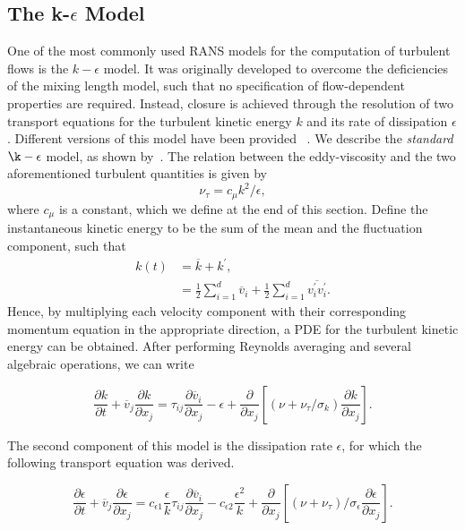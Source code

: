 \subsection{The k-$\epsilon$ Model}
One of the most commonly used RANS models for the computation of turbulent flows is the $k-\epsilon$ model. It was originally developed to overcome the deficiencies of the mixing length model, such that no specification of flow-dependent properties are required. Instead, closure is achieved through the resolution of two transport equations for the turbulent kinetic energy $k$ and its rate of dissipation $\epsilon$. Different versions of this model have been provided ~\cite{laundersharma, launderjones}. We describe the \textit{standard} $\k-\epsilon$ model, as shown by~\cite{bardina}. The relation between the eddy-viscosity and the two aforementioned turbulent quantities is given by
\begin{equation}
    \nu_\tau = c_\mu k^2/\epsilon,
\end{equation}
where $c_\mu$ is a constant, which we define at the end of this section. Define the instantaneous kinetic energy to be the sum of the mean and the fluctuation component, such that
\begin{align}
    k(t) &= \overline{k} + k^\prime, \nonumber \\
         &= \frac{1}{2} \sum_{i=1}^d \overline{v}_i + \frac{1}{2}\sum_{i=1}^d \overline{v_i^\prime v_i^\prime}.
\end{align}
Hence, by multiplying each velocity component with their corresponding momentum equation in the appropriate direction, a PDE for the turbulent kinetic energy can be obtained. After performing Reynolds averaging and several algebraic operations, we can write~\cite{wilcox1998turbulence}
\begin{eqBox}
\begin{equation}
    \frac{\partial k}{\partial t} + 
    \overline v_j \frac{\partial k}{\partial x_j} 
    = \tau_{ij} \frac{\partial\overline v_i}{\partial x_j} 
    - \epsilon + \frac{\partial}{\partial x_j}\left[(\nu + \nu_\tau/\sigma_k)\frac{\partial k}{\partial x_j}\right].
\end{equation}
\end{eqBox}
The second component of this model is the dissipation rate $\epsilon$, for which the following transport equation was derived. 
\begin{eqBox}
\begin{equation}
    \frac{\partial \epsilon}{\partial t}
    + \overline v_j \frac{\partial\epsilon}{\partial x_j}
    = c_{\epsilon 1}\frac{\epsilon}{k} \tau_{ij} \frac{\partial \overline v_i}{\partial x_j}
    - c_{\epsilon2} \frac{\epsilon^2}{k} 
    + \frac{\partial}{\partial x_j} \left[(\nu + \nu_\tau)/\sigma_\epsilon \frac{\partial\epsilon}{\partial x_j}\right].
\end{equation}
\end{eqBox}
